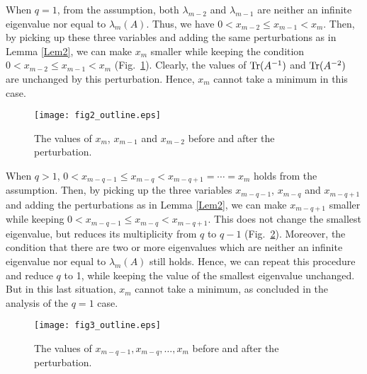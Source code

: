 \documentclass{amsart}
\begin{document}
When $q=1$, from the assumption, both $\lambda_{m-2}$ and $\lambda_{m-1}$ are neither an infinite eigenvalue nor equal to $\lambda_m(A)$. Thus, we have $0<x_{m-2}\le x_{m-1}<x_m$. Then, by picking up these three variables and adding the same perturbations as in Lemma \ref{Lem2}, we can make $x_m$ smaller while keeping the condition $0<x_{m-2}\le x_{m-1}<x_m$ (Fig.~\ref{fig:fig2}). Clearly, the values of $ {\rm Tr}(A^{-1}) $ and $ {\rm Tr}(A^{-2})$ are unchanged by this perturbation. Hence, $x_m$ cannot take a minimum in this case.

\begin{figure}[h]
\centerline{\texttt{[image: fig2\_outline.eps]}}
\caption{The values of $x_m$, $x_{m-1}$ and $x_{m-2}$ before and after the perturbation.}
\label{fig:fig2}
\end{figure}

When $q>1$, $0<x_{m-q-1}\le x_{m-q}<x_{m-q+1}=\cdots=x_m$ holds from the assumption. Then, by picking up the three variables $x_{m-q-1}$, $x_{m-q}$ and $x_{m-q+1}$ and adding the perturbations as in Lemma \ref{Lem2}, we can make $x_{m-q+1}$ smaller while keeping $0<x_{m-q-1}\le x_{m-q}<x_{m-q+1}$. This does not change the smallest eigenvalue, but reduces its multiplicity from $q$ to $q-1$ (Fig.~\ref{fig:fig3}). Moreover, the condition that there are two or more eigenvalues which are neither an infinite eigenvalue nor equal to $\lambda_m(A)$ still holds. Hence, we can repeat this procedure and reduce $q$ to 1, while keeping the value of the smallest eigenvalue unchanged. But in this last situation, $x_m$ cannot take a minimum, as concluded in the analysis of the $q=1$ case. 

\begin{figure}[h]
\centerline{\texttt{[image: fig3\_outline.eps]}}
\caption{The values of $x_{m-q-1}, x_{m-q}, \ldots, x_m$ before and after the perturbation.}
\label{fig:fig3}
\end{figure}
\end{document}

